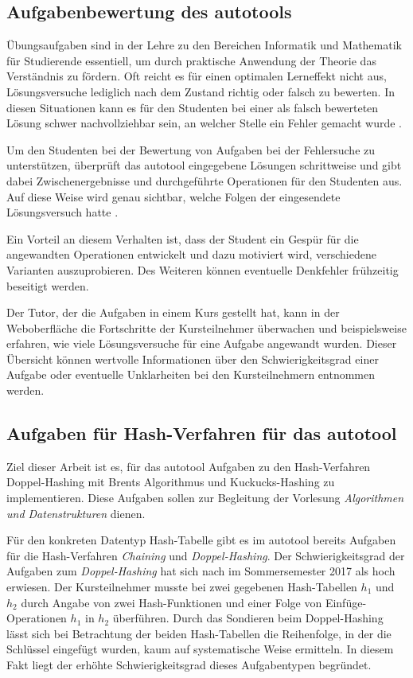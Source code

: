 \subsection{Aufgabenbewertung des autotools}
Übungsaufgaben sind in der Lehre zu den Bereichen Informatik und Mathematik für Studierende essentiell, um durch praktische Anwendung der Theorie das Verständnis zu fördern. Oft reicht es für einen optimalen Lerneffekt nicht aus, Lösungsversuche lediglich nach dem Zustand richtig oder falsch zu bewerten. In diesen Situationen kann es für den Studenten bei einer als falsch bewerteten Lösung schwer nachvollziehbar sein, an welcher Stelle ein Fehler gemacht wurde \cite[S.~2]{automatpvp}. 

Um den Studenten bei der Bewertung von Aufgaben bei der Fehlersuche zu unterstützen, überprüft das autotool eingegebene Lösungen schrittweise und gibt dabei Zwischenergebnisse und durchgeführte Operationen für den Studenten aus. Auf diese Weise wird genau sichtbar, welche Folgen der eingesendete Lösungsversuch hatte \cite[S.~2]{ATnetzw}. 

Ein Vorteil an diesem Verhalten ist, dass der Student ein Gespür für die angewandten Operationen entwickelt und dazu motiviert wird, verschiedene Varianten auszuprobieren. Des Weiteren können eventuelle Denkfehler frühzeitig beseitigt werden. 

Der Tutor, der die Aufgaben in einem Kurs gestellt hat, kann in der Weboberfläche die Fortschritte der Kursteilnehmer überwachen und beispielsweise erfahren, wie viele Lösungsversuche für eine Aufgabe angewandt wurden. Dieser Übersicht können wertvolle Informationen über den Schwierigkeitsgrad einer Aufgabe oder eventuelle Unklarheiten bei den Kursteilnehmern entnommen werden.

\subsection{Aufgaben für Hash-Verfahren für das autotool}
Ziel dieser Arbeit ist es, für das autotool Aufgaben zu den Hash-Verfahren Doppel-Hashing mit Brents Algorithmus und Kuckucks-Hashing zu implementieren. Diese Aufgaben sollen zur Begleitung der Vorlesung \textit{Algorithmen und Datenstrukturen} dienen. 

Für den konkreten Datentyp Hash-Tabelle gibt es im autotool bereits Aufgaben für die Hash-Verfahren \textit{Chaining} und \textit{Doppel-Hashing}. Der Schwierigkeitsgrad der Aufgaben zum \textit{Doppel-Hashing} hat sich nach \cite[S.~5]{ATerzeugads} im Sommersemester 2017 als hoch erwiesen. Der Kursteilnehmer musste bei zwei gegebenen Hash-Tabellen \(h_{1}\) und \(h_{2}\) durch Angabe von zwei Hash-Funktionen und einer Folge von Einfüge-Operationen \(h_{1}\) in \(h_{2}\) überführen. Durch das Sondieren beim Doppel-Hashing lässt sich bei Betrachtung der beiden Hash-Tabellen die Reihenfolge, in der die Schlüssel eingefügt wurden, kaum auf systematische Weise ermitteln. In diesem Fakt liegt der erhöhte Schwierigkeitsgrad dieses Aufgabentypen begründet. 

